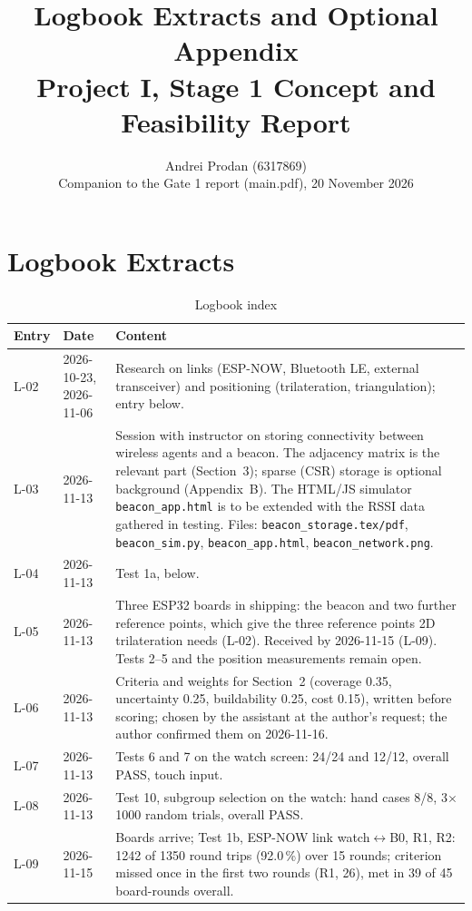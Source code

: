 \IfFileExists{IEEEtran.cls}{\documentclass[conference]{IEEEtran}}{\documentclass[10pt,twocolumn]{article}}
\providecommand{\IEEEauthorblockN}[1]{#1\\}
\providecommand{\IEEEauthorblockA}[1]{\small #1}
\begin{document}
\title{Logbook Extracts and Optional Appendix\\Project I, Stage 1 Concept and Feasibility Report}
\author{\IEEEauthorblockN{Andrei Prodan (6317869)}
\IEEEauthorblockA{Companion to the Gate 1 report (main.pdf), 20 November 2026}}
\date{}
\maketitle

\appendix
\section{Logbook Extracts}
\begin{table}[!t]
\caption{Logbook index}
\centering\footnotesize
\begin{tabularx}{\textwidth}{@{}l l Y@{}}
\toprule
Entry & Date & Content\\
\midrule
L-02 & 2026-10-23, 2026-11-06 & Research on links (ESP-NOW, Bluetooth LE, external transceiver) and positioning (trilateration, triangulation); entry below.\\
L-03 & 2026-11-13 & Session with instructor on storing connectivity between wireless agents and a beacon. The adjacency matrix is the relevant part (Section~3); sparse (CSR) storage is optional background (Appendix~B). The HTML/JS simulator \texttt{beacon\_app.html} is to be extended with the RSSI data gathered in testing. Files: \texttt{beacon\_storage.tex/pdf}, \texttt{beacon\_sim.py}, \texttt{beacon\_app.html}, \texttt{beacon\_network.png}.\\
L-04 & 2026-11-13 & Test 1a, below.\\
L-05 & 2026-11-13 & Three ESP32 boards in shipping: the beacon and two further reference points, which give the three reference points 2D trilateration needs (L-02). Received by 2026-11-15 (L-09). Tests 2--5 and the position measurements remain open.\\
L-06 & 2026-11-13 & Criteria and weights for Section~2 (coverage 0.35, uncertainty 0.25, buildability 0.25, cost 0.15), written before scoring; chosen by the assistant at the author's request; the author confirmed them on 2026-11-16.\\
L-07 & 2026-11-13 & Tests 6 and 7 on the watch screen: 24/24 and 12/12, overall PASS, touch input.\\
L-08 & 2026-11-13 & Test 10, subgroup selection on the watch: hand cases 8/8, 3$\times$1000 random trials, overall PASS.\\
L-09 & 2026-11-15 & Boards arrive; Test 1b, ESP-NOW link watch$\leftrightarrow$B0, R1, R2: 1242 of 1350 round trips (92.0\,\%) over 15 rounds; criterion missed once in the first two rounds (R1, 26), met in 39 of 45 board-rounds overall.\\

\end{tabularx}
\end{table}
\end{document}
